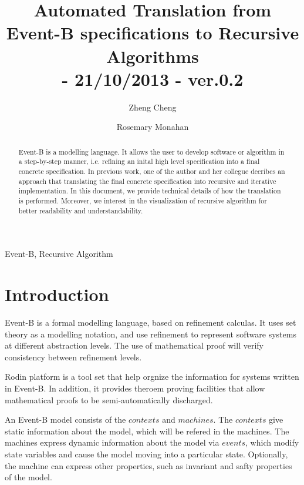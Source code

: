 \documentclass{easychair}
\newenvironment{keywords}{
       \list{}{\advance\topsep by0.35cm\relax\small
       \leftmargin=1cm
       \labelwidth=0.35cm
       \listparindent=0.35cm
       \itemindent\listparindent
       \rightmargin\leftmargin}\item[\hskip\labelsep
                                     \bfseries Keywords:]}
     {\endlist}
\begin{document}
\pagestyle{plain}

\title{Automated Translation from Event-B specifications to Recursive Algorithms
\\\small{- 21/10/2013 - ver.0.2} 
}
\author{
Zheng Cheng \and
Rosemary Monahan 
}


\maketitle  

\begin{abstract}
Event-B is a modelling language. It allows the user to develop software or algorithm in a step-by-step manner, i.e. refining an inital high level specification into a final concrete specification. In previous work, one of the author and her collegue decribes an approach that translating the final concrete specification into recursive and iterative implementation. In this document, we provide technical details of how the translation is performed. Moreover, we interest in the visualization of recursive algorithm for better readability and understandability.
 
\end{abstract}   

\begin{keywords}
 Event-B,
 Recursive Algorithm
\end{keywords}

\section{Introduction} %
Event-B is a formal modelling language, based on refinement calculas. It uses set theory as a modelling notation, and use refinement to represent software systems at different abstraction levels. The use of mathematical proof will verify consistency between refinement levels.

Rodin platform is a tool set that help orgnize the information for systems written in Event-B. In addition, it provides theroem proving facilities that allow mathematical proofs to be semi-automatically discharged.

An Event-B model consists of the $contexts$ and $machines$. The $contexts$ give static information about the model, which will be refered in the machines. The machines express dynamic information about the model via $events$, which modify state variables and cause the model moving into a particular state. Optionally, the machine can express other properties, such as invariant and safty properties of the model.
\end{document}
